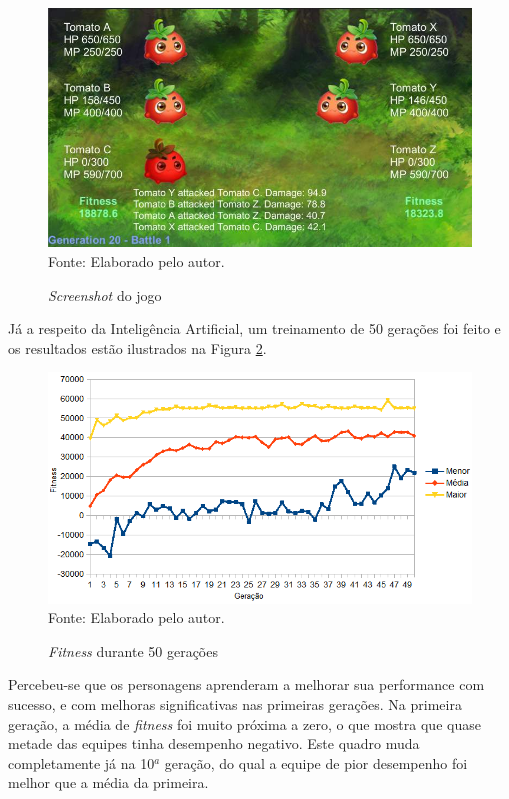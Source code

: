 \documentclass[
	12pt,					%
	openright,				%
	oneside,				%
	a4paper,				%
	bibjustif,				%
	chapter=TITLE,			%
	english,				%
	brazil,					%
	]{abntex2}
\newcommand{\source}[1]{\small Fonte: {#1}}
\begin{document}
	\begin{figure}[ht!]
		\centering
		\caption{\textit{Screenshot} do jogo}
		\includegraphics[scale=0.6]{img/GameScreenshot.jpg}\\
		\vspace{0.5mm}
		\source{Elaborado pelo autor.}
		\label{fig:gameScreenshot}
	\end{figure}

	Já a respeito da Inteligência Artificial,
	um treinamento de 50 gerações foi feito e os resultados estão ilustrados na Figura \ref{fig:fitnessResults}.
	
	\begin{figure}[ht!]
		\centering
		\caption{\textit{Fitness} durante 50 gerações}
		\includegraphics[scale=0.7]{img/AI-Result.png}\\
		\vspace{0.5mm}
		\source{Elaborado pelo autor.}
		\label{fig:fitnessResults}
	\end{figure}
	
	Percebeu-se que os personagens aprenderam a melhorar sua performance com sucesso,
	e com melhoras significativas nas primeiras gerações.
	Na primeira geração, a média de \textit{fitness} foi muito próxima a zero,
	o que mostra que quase metade das equipes tinha desempenho negativo.
	Este quadro muda completamente já na 10$^a$ geração,
	do qual a equipe de pior desempenho foi melhor que a média da primeira.
	
\end{document}
